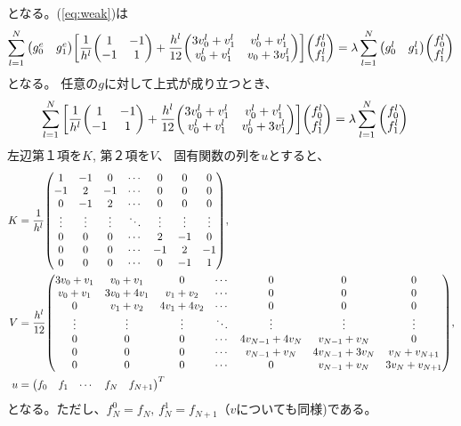 \documentclass[xelatex,ja=standard]{bxjsarticle}
\begin{document}
となる。(\ref{eq:weak})は
\begin{align}
    \sum_{l=1}^N \mqty(g^e_0 & g^e_1)\bigg[\frac{1}{h^l}\mqty(1 & -1 \\ -1 & 1)
     + \frac{h^l}{12}\mqty(3v_{0}^l +v_{1}^l & v_{0}^l +v_{1}^l\\ v_{0}^l +v_{1}^l&v_{0} +3v_{1}^l)\bigg]\mqty(f^l_0 \\ f^l_1)=\lambda\sum_{l=1}^N \mqty(g^l_0 & g^l_1)\mqty(f^l_0 \\ f^l_1)
\end{align}
となる。 任意の$g$に対して上式が成り立つとき、
\begin{align}
    \sum_{l=1}^N \bigg[\frac{1}{h^l}\mqty(1 & -1 \\ -1 & 1)
     + \frac{h^l}{12}\mqty(3v_{0}^l +v_{1}^l & v_{0}^l +v_{1}^l\\ v_{0}^l +v_{1}^l&v_{0}^l +3v_{1}^l)\bigg]\mqty(f^l_0 \\ f^l_1)&=\lambda\sum_{l=1}^N \mqty(f^l_0 \\ f^l_1)
\end{align}     
左辺第１項を$K$, 第２項を$V$、 固有関数の列を$u$とすると、
\begin{align}
    K&=
     \frac{1}{h^l}\mqty(
     1 & -1 & 0 & \cdots & 0 & 0 & 0 \\
     -1 & 2 & -1 & \cdots & 0 & 0 & 0 \\
     0 & -1 & 2 & \cdots & 0 & 0 & 0 \\
     \vdots & \vdots & \vdots & \ddots & \vdots  & \vdots& \vdots\\
     0 & 0 & 0 & \cdots & 2 & -1& 0 \\
     0 & 0 & 0 & \cdots & -1 & 2& -1 \\
     0 & 0 & 0 & \cdots & 0 & -1& 1 \\
     ),\\
     V&= \frac{h^l}{12}\mqty(
        3v_{0} +v_{1} & v_{0} +v_{1} & 0 & \cdots & 0 & 0 & 0 \\
        v_{0} +v_{1} & 3v_{0} + 4v_{1} & v_{1} +v_{2} & \cdots & 0 & 0 & 0 \\
        0 & v_{1} +v_{2} & 4v_{1} + 4v_{2} & \cdots & 0 & 0 & 0 \\
        \vdots & \vdots & \vdots & \ddots & \vdots  & \vdots& \vdots\\
        0 & 0 & 0 & \cdots & 4v_{N-1} + 4v_{N} & v_{N-1} +v_{N}& 0 \\
        0 & 0 & 0 & \cdots & v_{N-1} +v_{N} & 4v_{N-1} + 3v_{N}& v_{N} +v_{N+1} \\
        0 & 0 & 0 & \cdots & 0 & v_{N-1} +v_{N}& 3v_{N} +v_{N+1} \\
        ),\\
    u&=\mqty(f_0 & f_1 & \cdots & f_N & f_{N+1})^T
\end{align}
となる。ただし、$f_N^0 = f_N,\, f_N^1 = f_{N+1}$（$v$についても同様)である。
\end{document}
